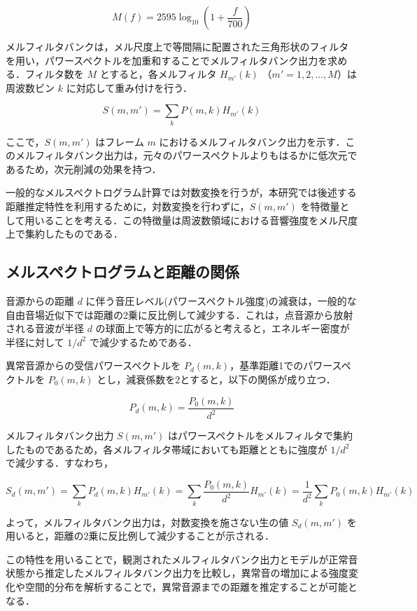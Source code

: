 \documentclass[../main]{subfiles}
\begin{document}
\begin{equation}
M(f) = 2595 \log_{10}\left(1 + \frac{f}{700}\right)
\end{equation}

メルフィルタバンクは，メル尺度上で等間隔に配置された三角形状のフィルタを用い，パワースペクトルを加重和することでメルフィルタバンク出力を求める．フィルタ数を $M$ とすると，各メルフィルタ $H_{m'}(k)$ （$m' = 1, 2, \dots, M$）は周波数ビン $k$ に対応して重み付けを行う．

\begin{equation}
S(m, m') = \sum_{k} P(m, k) H_{m'}(k)
\end{equation}

ここで，$S(m, m')$ はフレーム $m$ におけるメルフィルタバンク出力を示す．このメルフィルタバンク出力は，元々のパワースペクトルよりもはるかに低次元であるため，次元削減の効果を持つ．

一般的なメルスペクトログラム計算では対数変換を行うが，本研究では後述する距離推定特性を利用するために，対数変換を行わずに，$S(m, m')$ を特徴量として用いることを考える．この特徴量は周波数領域における音響強度をメル尺度上で集約したものである．

\subsection{メルスペクトログラムと距離の関係}

音源からの距離 $d$ に伴う音圧レベル(パワースペクトル強度)の減衰は，一般的な自由音場近似下では距離の2乗に反比例して減少する．これは，点音源から放射される音波が半径 $d$ の球面上で等方的に広がると考えると，エネルギー密度が半径に対して $1/d^2$ で減少するためである．

異常音源からの受信パワースペクトルを $P_d(m, k)$，基準距離1でのパワースペクトルを $P_0(m, k)$ とし，減衰係数を2とすると，以下の関係が成り立つ．

\begin{equation}
P_d(m, k) = \frac{P_0(m, k)}{d^2}
\end{equation}

メルフィルタバンク出力 $S(m, m')$ はパワースペクトルをメルフィルタで集約したものであるため，各メルフィルタ帯域においても距離とともに強度が $1/d^2$ で減少する．すなわち，

\begin{equation}
S_d(m, m') = \sum_{k} P_d(m, k) H_{m'}(k) = \sum_{k} \frac{P_0(m, k)}{d^2} H_{m'}(k) = \frac{1}{d^2} \sum_{k} P_0(m, k) H_{m'}(k)
\end{equation}

よって，メルフィルタバンク出力は，対数変換を施さない生の値 $S_d(m, m')$ を用いると，距離の2乗に反比例して減少することが示される．

この特性を用いることで，観測されたメルフィルタバンク出力とモデルが正常音状態から推定したメルフィルタバンク出力を比較し，異常音の増加による強度変化や空間的分布を解析することで，異常音源までの距離を推定することが可能となる．
\end{document}
